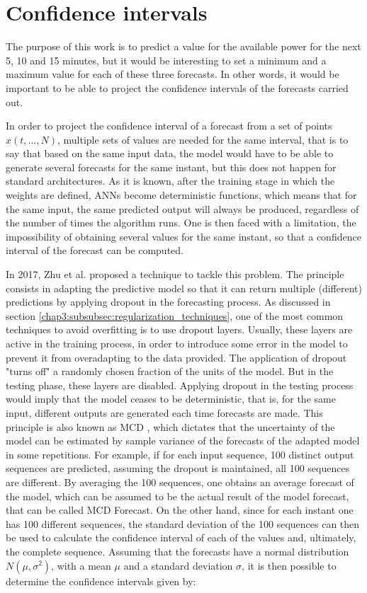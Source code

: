 \section{Confidence intervals}\label{chap3:section:stage_3}

The purpose of this work is to predict a value for the available power for the next 5, 10 and 15 minutes, but it would be interesting to set a minimum and a maximum value for each of these three forecasts. In other words, it would be important to be able to project the confidence intervals of the forecasts carried out. 

In order to project the confidence interval of a forecast from a set of points $x(t, ..., N)$, multiple sets of values are needed for the same interval, that is to say that based on the same input data, the model would have to be able to generate several forecasts for the same instant, but this does not happen for standard architectures. As it is known, after the training stage in which the weights are defined, \ac{ANNs} become deterministic functions, which means that for the same input, the same predicted output will always be produced, regardless of the number of times the algorithm runs. One is then faced with a limitation, the impossibility of obtaining several values for the same instant, so that a confidence interval of the forecast can be computed.

In 2017, Zhu et al. \cite{uber} proposed a technique to tackle this problem. The principle consists in adapting the predictive model so that it can return multiple (different) predictions by applying dropout in the forecasting process. As discussed in section \ref{chap3:subsubsec:regularization_techniques}, one of the most common techniques to avoid overfitting is to use dropout layers. Usually, these layers are active in the training process, in order to introduce some error in the model to prevent it from overadapting to the data provided. The application of dropout "turns off" a randomly chosen fraction of the units of the model. But in the testing phase, these layers are disabled. Applying dropout in the testing process would imply that the model ceases to be deterministic, that is, for the same input, different outputs are generated each time forecasts are made. 
This principle is also known as \acf{MCD} \cite{uber2}, which dictates that the uncertainty of the model can be estimated by sample variance of the forecasts of the adapted model in some repetitions. For example, if for each input sequence, 100 distinct output sequences are predicted, assuming the dropout is maintained, all 100 sequences are different. By averaging the 100 sequences, one obtains an average forecast of the model, which can be assumed to be the actual result of the model forecast, that can be called \ac{MCD} Forecast. On the other hand, since for each instant one has 100 different sequences, the standard deviation of the 100 sequences can then be used to calculate the confidence interval of each of the values and, ultimately, the complete sequence. Assuming that the forecasts have a normal distribution $N(\mu, \sigma^2)$, with a mean $\mu$ and a standard deviation $\sigma$, it is then possible to determine the confidence intervals given by: 

